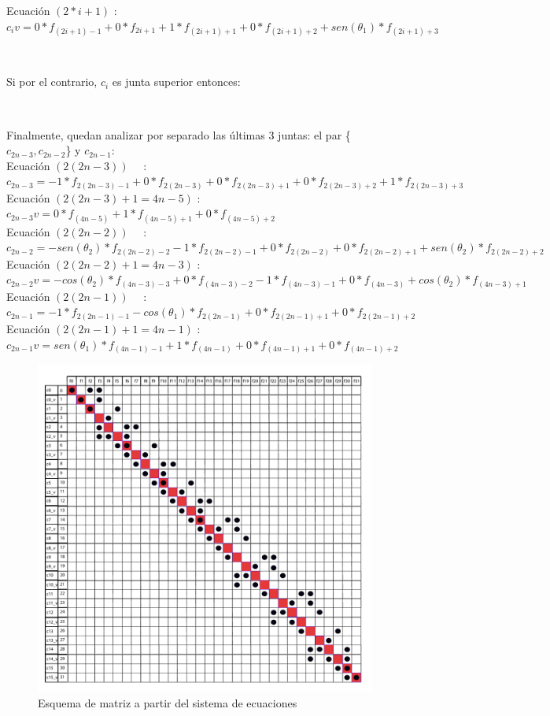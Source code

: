 Ecuación $(2*i+1)$ : $c_{i} v = 0*f_{(2i+1)-1} + 0*f_{2i+1} + 1*f_{(2i+1)+1} + 0*f_{(2i+1)+2} + sen(\theta_{1})*f_{(2i+1)+3}$

~

Si por el contrario, $c_{i}$ es junta superior entonces:


~

Finalmente, quedan analizar por separado las últimas 3 juntas: el par \{$c_{2n-3},c_{2n-2}$\} y $c_{2n-1}$: \\

Ecuación $(2(2n-3))$ \ \ : $c_{2n-3} = -1*f_{2(2n-3)-1} + 0*f_{2(2n-3)} + 0*f_{2(2n-3)+1} + 0*f_{2(2n-3)+2} + 1*f_{2(2n-3)+3} $ \\

Ecuación $(2(2n-3)+1 = 4n-5)$ : $c_{2n-3} v = 0*f_{(4n-5)} + 1*f_{(4n-5)+1} + 0*f_{(4n-5)+2} $ \\

Ecuación $(2(2n-2))$ \ \ : $c_{2n-2} = -sen(\theta_{2})*f_{2(2n-2)-2} - 1*f_{2(2n-2)-1} + 0*f_{2(2n-2)} + 0*f_{2(2n-2)+1} + sen(\theta_{2})*f_{2(2n-2)+2} $ \\

Ecuación $(2(2n-2)+1 = 4n-3)$ : $c_{2n-2} v = -cos(\theta_{2})*f_{(4n-3)-3} + 0*f_{(4n-3)-2} - 1*f_{(4n-3)-1} + 0*f_{(4n-3)} + cos(\theta_{2})*f_{(4n-3)+1} $ \\

Ecuación $(2(2n-1))$ \ \ : $c_{2n-1} = -1*f_{2(2n-1)-1} - cos(\theta_{1})*f_{2(2n-1)} + 0*f_{2(2n-1)+1} + 0*f_{2(2n-1)+2}$ \\

Ecuación $(2(2n-1)+1 = 4n-1)$ : $c_{2n-1} v = sen(\theta_{1})*f_{(4n-1)-1} + 1*f_{(4n-1)} + 0*f_{(4n-1)+1} + 0*f_{(4n-1)+2}$ \\


\begin{figure}[!h]
	\begin{center}
		  \includegraphics[scale=0.5]{Imagenes/im_2.pdf}
		  \caption{Esquema de matriz a partir del sistema de ecuaciones}
		  \label{fig:contra1}
	\end{center}
\end{figure}
\FloatBarrier